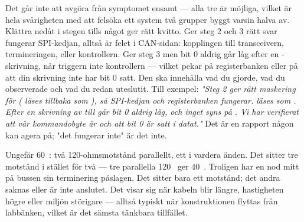  Det går inte att avgöra från symptomet ensamt --- alla tre är möjliga, vilket är hela
svårigheten med att felsöka ett system två grupper byggt varsin halva av.
 Klättra nedåt i stegen tills något ger rätt kvitto. Ger steg 2 och 3 rätt svar fungerar
SPI-kedjan, alltså är felet i CAN-sidan: kopplingen till transceivern, termineringen, eller
kontrollern. Ger steg 3  men  bit 0 aldrig går låg efter en
-skrivning, når triggern inte kontrollern --- vilket pekar på registerbanken eller
på att din skrivning inte har bit 0 satt.
 Den ska innehålla vad du gjorde, vad du observerade och vad du redan uteslutit. Till
exempel: \emph{"Steg 2 ger rätt maskering för  ( läses tillbaka som
), så SPI-kedjan och registerbanken fungerar.  läses som
. Efter en skrivning av  till  går bit 0 aldrig låg, och
inget syns på . Vi har verifierat att vår kommandobyte är  och att bit 0
är satt i datat."} Det är en rapport någon kan agera på; "det fungerar inte" är det inte.

 Ungefär 60~\textohm: två 120-ohmsmotstånd parallellt, ett i vardera änden.
 Det sitter tre motstånd i stället för två --- tre parallella 120~\textohm{} ger
40~\textohm. Troligen har en nod mitt på bussen sin terminering påslagen.
 Det sitter bara ett motstånd; det andra saknas eller är inte anslutet. Det visar sig när
kabeln blir längre, hastigheten högre eller miljön störigare --- alltså typiskt när konstruktionen
flyttas från labbänken, vilket är det sämsta tänkbara tillfället.
